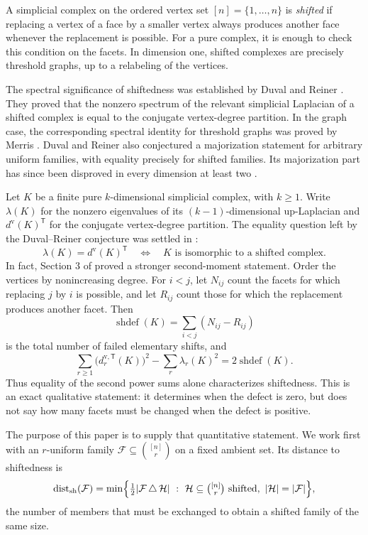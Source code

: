 \documentclass[11pt,reqno]{amsart}
\theoremstyle{plain}
\theoremstyle{definition}
\DeclareMathOperator{\shdef}{shdef}
\DeclareMathOperator{\dsh}{dist_{sh}}
\newcommand{\dv}{d^{\mathrm{v}}}
\newcommand{\dvT}[1]{d^{\mathrm{v},\mathsf{T}}_{#1}}
\newcommand{\F}{\mathcal{F}}
\newcommand{\HH}{\mathcal{H}}
\begin{document}
A simplicial complex on the ordered vertex set $[n]=\{1,\dots,n\}$ is \emph{shifted} if replacing a
vertex of a face by a smaller vertex always produces another face whenever the replacement is
possible. For a pure complex, it is enough to check this condition on the facets. In dimension one,
shifted complexes are precisely threshold graphs, up to a relabeling of the vertices.

The spectral significance of shiftedness was established by Duval and Reiner
\cite{DuvalReiner}. They proved that the nonzero spectrum of the relevant simplicial Laplacian of a
shifted complex is equal to the conjugate vertex-degree partition. In the graph case, the
corresponding spectral identity for threshold graphs was proved by Merris \cite{Merris}. Duval and
Reiner also conjectured a majorization statement for arbitrary uniform families, with equality
precisely for shifted families. Its majorization part has since been disproved in every dimension at
least two \cite{Huang,ZSF}.

Let $K$ be a finite pure $k$-dimensional simplicial complex, with $k\ge1$. Write $\lambda(K)$ for
the nonzero
eigenvalues of its $(k-1)$-dimensional up-Laplacian and $\dv(K)^{\mathsf T}$ for the conjugate
vertex-degree partition. The equality question left by the Duval--Reiner conjecture was settled in
\cite{Gupta}:
\begin{equation}\label{eq:equality}
\lambda(K)=\dv(K)^{\mathsf T}
\quad\Longleftrightarrow\quad
K\text{ is isomorphic to a shifted complex}.
\end{equation}
In fact, Section 3 of \cite{Gupta} proved a stronger second-moment statement. Order the vertices by
nonincreasing degree. For $i<j$, let $N_{ij}$ count the facets for which replacing $j$ by $i$ is
possible, and let $R_{ij}$ count those for which the replacement produces another facet. Then
\[
\shdef(K)=\sum_{i<j}(N_{ij}-R_{ij})
\]
is the total number of failed elementary shifts, and
\begin{equation}\label{eq:defect}
\sum_{r\ge1}\bigl(\dvT{r}(K)\bigr)^2-
\sum_r\lambda_r(K)^2=2\shdef(K).
\end{equation}
Thus equality of the second power sums alone characterizes shiftedness. This is an exact
qualitative statement: it determines when the defect is zero, but does not say how many facets must
be changed when the defect is positive.

The purpose of this paper is to supply that quantitative statement. We work first with an
$r$-uniform family $\F\subseteq\binom{[n]}r$ on a fixed ambient set. Its distance to shiftedness is
\[
\dsh(\F)=\min\Bigl\{\tfrac12|\F\,\triangle\,\HH|\ :\
\HH\subseteq\tbinom{[n]}{r}\ \text{shifted},\ |\HH|=|\F|\Bigr\},
\]
the number of members that must be exchanged to obtain a shifted family of the same size.
\end{document}
